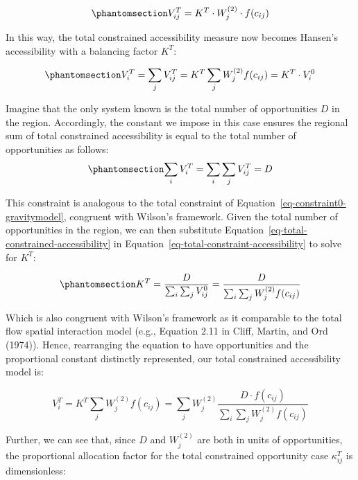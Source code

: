 \documentclass[
]{article}
\begin{document}
\begin{equation}\phantomsection\label{eq-total-constrained-access}{
V^T_{ij} = K^T \cdot W_j^{(2)} \cdot f(c_{ij})
}\end{equation}

In this way, the total constrained accessibility measure now becomes
Hansen's accessibility with a balancing factor \(K^T\):

\begin{equation}\phantomsection\label{eq-total-constrained-accessibility}{
V^T_i = \sum_j V^T_{ij} = K^T \sum_j W^{(2)}_jf(c_{ij}) = K^T \cdot V^0_i
}\end{equation}

Imagine that the only system known is the total number of opportunities
\(D\) in the region. Accordingly, the constant we impose in this case
ensures the regional sum of total constrained accessibility is equal to
the total number of opportunities as follows:
\begin{equation}\phantomsection\label{eq-total-constraint-accessibility}{
\sum_i V^T_{i} = \sum_i\sum_j V^T_{ij} = D
}\end{equation}

This constraint is analogous to the total constraint of
Equation~\ref{eq-constraint0-gravitymodel}, congruent with Wilson's
framework. Given the total number of opportunities in the region, we can
then substitute Equation~\ref{eq-total-constrained-accessibility} in
Equation~\ref{eq-total-constraint-accessibility} to solve for \(K^T\):

\begin{equation}\phantomsection\label{eq-total-opportunity-balancing-factor}{
K^T =\frac{D}{\sum_i\sum_j V^0_{ij}} = \frac{D}{\sum_i\sum_j W^{(2)}_jf(c_{ij})}
}\end{equation}

Which is also congruent with Wilson's framework as it comparable to the
total flow spatial interaction model (e.g., Equation 2.11 in Cliff,
Martin, and Ord (1974)). Hence, rearranging the equation to have
opportunities and the proportional constant distinctly represented, our
total constrained accessibility model is:

\[
V^T_i = K^T\sum_j W^{(2)}_jf(c_{ij}) = \sum_j W^{(2)}_j\frac{D\cdot f(c_{ij})}{\sum_i\sum_j W^{(2)}_jf(c_{ij})}
\]

Further, we can see that, since \(D\) and \(W^{(2)}_j\) are both in
units of opportunities, the proportional allocation factor for the total
constrained opportunity case \(\kappa_{ij}^T\) is dimensionless:
\end{document}
